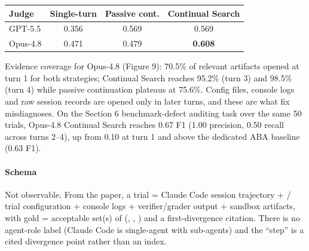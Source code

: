 \begin{center}\small
\begin{tabular}{@{}lccc@{}}\toprule
Judge & Single-turn & Passive cont. & Continual Search\\\midrule
GPT-5.5 & 0.356 & 0.569 & 0.569\\
Opus-4.8 & 0.471 & 0.479 & \textbf{0.608}\\\bottomrule
\end{tabular}
\end{center}
Evidence coverage for Opus-4.8 (Figure 9): 70.5\% of relevant artifacts opened at turn 1 for both strategies; Continual Search reaches 95.2\% (turn 3) and 98.5\% (turn 4) while passive continuation plateaus at 75.6\%. Config files, console logs and raw session records are opened only in later turns, and these are what fix misdiagnoses. On the Section 6 benchmark-defect auditing task over the same 50 trials, Opus-4.8 Continual Search reaches 0.67 F1 (1.00 precision, 0.50 recall across turns 2--4), up from 0.10 at turn 1 and above the dedicated ABA baseline (0.63 F1).

\paragraph{Schema} Not observable. From the paper, a trial = Claude Code session trajectory +  / trial configuration + console logs + verifier/grader output + sandbox artifacts, with gold = acceptable set(s) of (, , ) and a first-divergence citation. There is no agent-role label (Claude Code is single-agent with sub-agents) and the ``step'' is a cited divergence point rather than an index.

